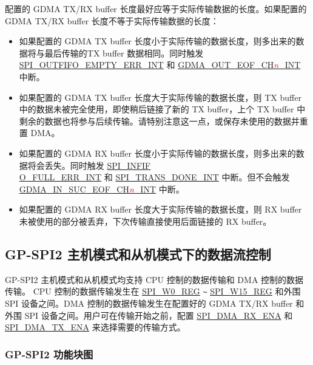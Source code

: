 \documentclass[main\_\_CN.tex]{subfiles}
\begin{document}
配置的 GDMA TX/RX buffer 长度最好应等于实际传输数据的长度。如果配置的 GDMA TX/RX buffer 长度不等于实际传输数据的长度：

\begin{itemize}
    \item 如果配置的 GDMA TX buffer 长度小于实际传输的数据长度，则多出来的数据将与最后传输的TX buffer 数据相同。同时触发 \hyperref[int:SPIOUTFIFOEMPTYERRINT]{SPI\_OUTFIFO\_EMPTY\_ERR\_INT} 和 \hyperref[int:GDMAOUTEOFINT]{GDMA\_OUT\_EOF\_CH\textcolor{red}{\it{n}}\_INT} 中断。

    \item 如果配置的 GDMA TX buffer 长度大于实际传输的数据长度，则 TX buffer 中的数据未被完全使用，即使稍后链接了新的 TX buffer，上个 TX buffer 中剩余的数据也将参与后续传输。请特别注意这一点，或保存未使用的数据并重置 DMA。

    \item 如果配置的 GDMA RX buffer 长度小于实际传输的数据长度，则多出来的数据将会丢失。同时触发 \hyperref[int:SPIINFIFOFULLERRINT]{SPI\_INFIF\\O\_FULL\_ERR\_INT} 和 \hyperref[int:SPITRANSDONEINT]{SPI\_TRANS\_DONE\_INT} 中断。但不会触发 \hyperref[int:GDMAINSUCEOFINT]{GDMA\_IN\_SUC\_EOF\_CH\textcolor{red}{\it{n}}\_INT}  中断。

    \item 如果配置的 GDMA RX buffer 长度大于实际传输的数据长度，则 RX buffer 未被使用的部分被丢弃，下次传输直接使用后面链接的 RX buffer。

\end{itemize}

\subsection{ GP-SPI2 主机模式和从机模式下的数据流控制}\label{sec:spi-func-descr-data-flow-ctrl-gp-spi2-master-slave}

GP-SPI2 主机模式和从机模式均支持 CPU 控制的数据传输和 DMA 控制的数据传输。
CPU 控制的数据传输发生在 \hyperref[regdesc:SPIW0REG]{SPI\_W0\_REG} \verb+~+ \hyperref[regdesc:SPIW15REG]{SPI\_W15\_REG} 和外围 SPI 设备之间。DMA 控制的数据传输发生在配置好的 GDMA TX/RX buffer 和外围 SPI 设备之间。用户可在传输开始之前，配置 \hyperref[fielddesc:SPIDMARXENA]{SPI\_DMA\_RX\_ENA} 和 \hyperref[fielddesc:SPIDMATXENA]{SPI\_DMA\_TX\_ENA} 来选择需要的传输方式。

\subsubsection{GP-SPI2 功能块图}
\end{document}
